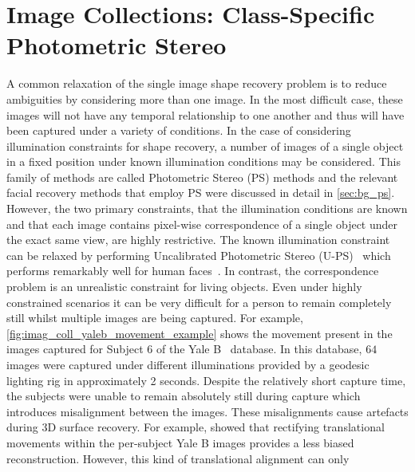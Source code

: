 \chapter{Image Collections: Class-Specific Photometric Stereo}\label{ch:imag_coll}
\minitoc{}
A common relaxation of the single image shape recovery problem is to reduce
ambiguities by considering more than one image. In the most difficult case,
these images will not have any temporal relationship to one another and thus
will have been captured under a variety of conditions. In the case of
considering illumination constraints for shape recovery, a number of images
of a single object in a fixed position under known illumination conditions
may be considered. This family of methods are called Photometric Stereo (PS)
methods and the relevant facial recovery methods that employ PS were discussed
in detail in \cref{sec:bg_ps}.
However, the two primary constraints, that the illumination conditions are known
and that each image contains pixel-wise correspondence of a single object under
the exact same view, are highly restrictive. The known illumination constraint
can be relaxed by performing
Uncalibrated Photometric Stereo (U-PS)~\cite{hayakawa1994photometric,%
basri2007photometric} which performs remarkably well for
human faces~\cite{KemelmacherShlizerman:2013iv,kemelmacher2011face,%
kemelmacher2012collection}. In contrast, the correspondence problem is an
unrealistic constraint for living objects. Even under highly constrained
scenarios it can be very difficult for a person to remain completely still
whilst multiple images are being captured.
For example, \cref{fig:imag_coll_yaleb_movement_example} shows the movement
present in the images captured for Subject 6 of the
Yale B~\cite{georghiades2001fromfew} database. In this database, $64$ images
were captured under different illuminations provided by a geodesic lighting rig in
approximately 2 seconds. Despite the relatively short capture time, the subjects
were unable to remain absolutely still during capture which introduces
misalignment between the images. These misalignments cause artefacts
during 3D surface recovery.
For example, \citet{harrison2012translational} showed that rectifying
translational movements within the per-subject Yale B images provides a less
biased reconstruction. However, this kind of translational alignment can only
